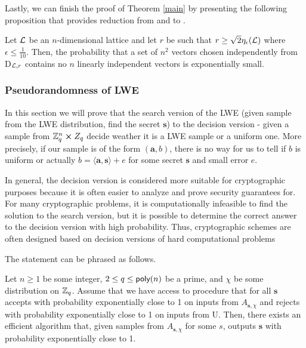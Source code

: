 Lastly, we can finish the proof of Theorem \ref{main} by presenting the following proposition that provides reduction from  and  to .

\begin{proposition}
	Let $\mathcal{L}$ be an $n$-dimensional lattice and let $r$ be such that $r \geq \sqrt{2}\eta_{\epsilon}(\mathcal{L})$ where $\epsilon \leq \frac{1}{10}$. Then, the probability that a set of $n^2$ vectors chosen independently from D$_{\mathcal{L},r}$ contains no $n$ linearly independent vectors is exponentially small.
\end{proposition}

\subsubsection{Pseudorandomness of LWE}
In this section we will prove that the search version of the LWE (given sample from the LWE distribution, find the secret $\bm{s}$) to the decision version - given a sample from $\mathbb{Z}_q^n \cross Z_q$ decide weather it is a LWE sample or a uniform one. More precisely, if our sample is of the form $(\bm{a}, b)$, there is no way for us to tell if $b$ is uniform or actually $b = \langle \bm{a}, \bm{s} \rangle + e$ for some secret $\bm{s}$ and small error $e$.

In general, the decision version is considered more suitable for cryptographic purposes because it is often easier to analyze and prove security guarantees for. For many cryptographic problems, it is computationally infeasible to find the solution to the search version, but it is possible to determine the correct answer to the decision version with high probability. Thus, cryptographic schemes are often designed based on decision versions of hard computational problems

The statement can be phrased as follows.
\begin{theorem}\label{s-to-d}
	Let $n \geq 1$ be some integer, $2 \leq q\leq \alg{poly}(n)$ be a prime, and $\chi$ be some distribution on $\mathbb{Z}_q$. Assume that we have access to procedure  that for all $\bm{s}$ accepts with probability exponentially close to 1 on inputs from $A_{\bm{s},\chi}$ and rejects with probability exponentially close to 1 on inputs from U. Then, there exists an efficient algorithm  that, given samples from $A_{\bm{s},\chi}$ for some $s$, outputs $\bm{s}$ with probability exponentially close to 1.
\end{theorem}

